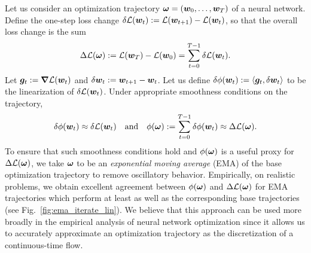 Let us consider an optimization trajectory $\bm{\omega} = ({\boldsymbol w}_0, \ldots, {\boldsymbol w}_T)$ of a neural network. Define the one-step loss change $\delta \mathcal{L}({\boldsymbol w}_t) := \mathcal{L}({\boldsymbol w}_{t+1}) - \mathcal{L}({\boldsymbol w}_t)$, so that the overall loss change is the sum
\[
\Delta \mathcal{L}(\bm{\omega}) := \mathcal{L}({\boldsymbol w}_T) - \mathcal{L}({\boldsymbol w}_0) = \sum\limits_{t=0}^{T-1} \delta \mathcal{L}({\boldsymbol w}_t).
\]
Let ${\boldsymbol g}_t := \grad \mathcal{L}({\boldsymbol w}_t)$ and $\delta {\boldsymbol w}_t := {\boldsymbol w}_{t+1} - {\boldsymbol w}_t$. Let us define $\delta \phi({\boldsymbol w}_t) := \left\langle {\boldsymbol g}_t, \delta {\boldsymbol w}_t \right\rangle$ to be the linearization of $\delta \mathcal{L}({\boldsymbol w}_t)$. Under appropriate smoothness conditions on the trajectory,
\begin{equation}\label{eq:linear_defs}
    \delta \phi({\boldsymbol w}_t) \approx \delta \mathcal{L}({\boldsymbol w}_t)
\text{ ~~and~~ } \phi(\bm{\omega}) := \sum\limits_{t=0}^{T-1} \delta \phi({\boldsymbol w}_t) \approx \Delta \mathcal{L}(\bm{\omega}).
\end{equation}
To ensure that such smoothness conditions hold and $\phi(\bm{\omega})$ is a useful proxy for $\Delta \mathcal{L}(\bm{\omega})$, we take $\bm{\omega}$ to be an \textit{exponential moving average} (EMA) of the base optimization trajectory to remove oscillatory behavior. Empirically, on realistic problems, we obtain excellent agreement between $\phi(\bm{\omega})$ and $\Delta \mathcal{L}(\bm{\omega})$ for EMA trajectories which perform at least as well as the corresponding base trajectories (see Fig.\ \ref{fig:ema_iterate_lin}). 
We believe that this approach can be used more broadly in the empirical analysis of neural network optimization since it allows us to accurately approximate an optimization trajectory as the discretization of a continuous-time flow. 


